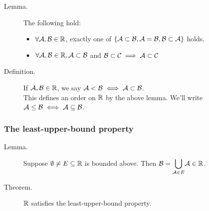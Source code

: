 \documentclass[letterpaper,11pt]{article}
\begin{document}
\begin{description}
\item[Lemma.] The following hold:
  \begin{itemize}
  \item $\forall \mathcal{A},\mathcal{B}\in\mathbb{R}$, exactly one of
      $\{\mathcal{A}\subset\mathcal{B}, \mathcal{A}=\mathcal{B}, \mathcal{B}\subset\mathcal{A}\}$ holds.
  \item $\forall \mathcal{A},\mathcal{B}\in\mathbb{R}, \mathcal{A}\subset\mathcal{B}$ and
      $\mathcal{B}\subset\mathcal{C} \implies \mathcal{A}\subset\mathcal{C}$
  \end{itemize}


\item[Definition.] If $\mathcal{A},\mathcal{B}\in\mathbb{R}$, we say $\mathcal{A}<\mathcal{B} \iff \mathcal{A}\subset\mathcal{B}$.\\
    This defines an order on $\mathbb{R}$ by the above lemma.
    We'll write $\mathcal{A}\le\mathcal{B}\iff\mathcal{A}\subseteq\mathcal{B}$.
\end{description}

\subsubsection{The least-upper-bound property}
\begin{description}
\item[Lemma.] Suppose $\emptyset\ne E\subseteq\mathbb{R}$ is bounded above.
    Then $\mathcal{B}=\displaystyle{\mathop{\bigcup}_{\mathcal{A}\in E}}\mathcal{A} \in\mathbb{R}$.
\item[Theorem.] $\mathbb{R}$ satisfies the least-upper-bound property.
\end{description}
\end{document}
